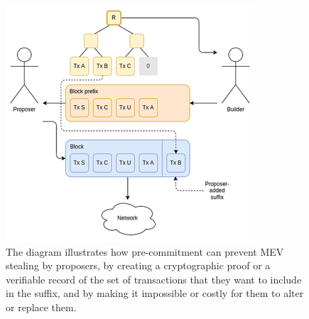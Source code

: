 \begin{center}
	\begin{figure}
		\centering
		\includegraphics[width=0.6\linewidth]{Fig/22/F10}
		\caption{The diagram illustrates how pre-commitment can prevent MEV stealing by proposers, by creating a cryptographic proof or a verifiable record of the set of transactions that they want to include in the suffix, and by making it impossible or costly for them to alter or replace them.}
		\label{fig:L22_f10}
	\end{figure}
\end{center}